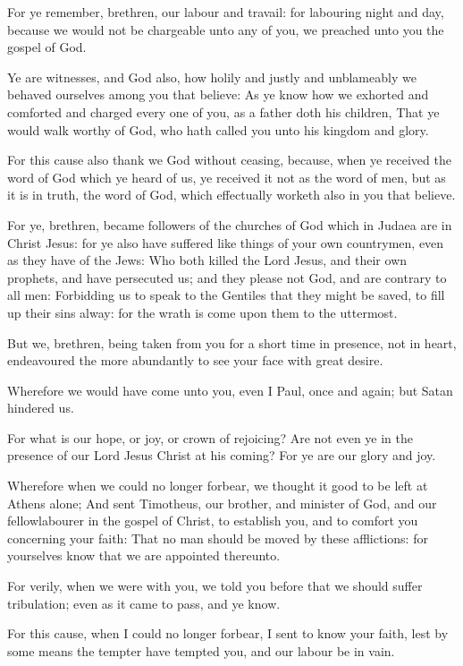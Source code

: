 \Verse For ye remember, brethren, our labour and travail: for labouring night and day, because we would not be chargeable unto any of you, we preached unto you the gospel of God.

\Verse Ye are witnesses, and God also, how holily and justly and unblameably we behaved ourselves among you that believe: \Verse As ye know how we exhorted and comforted and charged every one of you, as a father doth his children, \Verse That ye would walk worthy of God, who hath called you unto his kingdom and glory.

\Verse For this cause also thank we God without ceasing, because, when ye received the word of God which ye heard of us, ye received it not as the word of men, but as it is in truth, the word of God, which effectually worketh also in you that believe.

\Verse For ye, brethren, became followers of the churches of God which in Judaea are in Christ Jesus: for ye also have suffered like things of your own countrymen, even as they have of the Jews: \Verse Who both killed the Lord Jesus, and their own prophets, and have persecuted us; and they please not God, and are contrary to all men: \Verse Forbidding us to speak to the Gentiles that they might be saved, to fill up their sins alway: for the wrath is come upon them to the uttermost.

\Verse But we, brethren, being taken from you for a short time in presence, not in heart, endeavoured the more abundantly to see your face with great desire.

\Verse Wherefore we would have come unto you, even I Paul, once and again; but Satan hindered us.

\Verse For what is our hope, or joy, or crown of rejoicing? Are not even ye in the presence of our Lord Jesus Christ at his coming?  \Verse For ye are our glory and joy.


\Chapter
\Verse Wherefore when we could no longer forbear, we thought it good to be left at Athens alone; \Verse And sent Timotheus, our brother, and minister of God, and our fellowlabourer in the gospel of Christ, to establish you, and to comfort you concerning your faith: \Verse That no man should be moved by these afflictions: for yourselves know that we are appointed thereunto.

\Verse For verily, when we were with you, we told you before that we should suffer tribulation; even as it came to pass, and ye know.

\Verse For this cause, when I could no longer forbear, I sent to know your faith, lest by some means the tempter have tempted you, and our labour be in vain.

